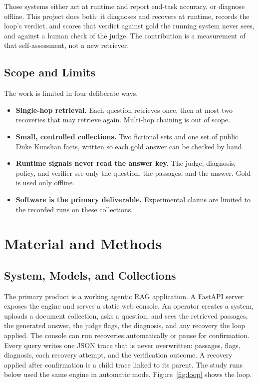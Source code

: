 \documentclass[12pt, a4paper, oneside]{report}
\begin{document}
Those systems either act at runtime and report end-task accuracy, or
diagnose offline. This project does both: it diagnoses and recovers at
runtime, records the loop's verdict, and scores that verdict against gold
the running system never sees, and against a human check of the judge.
The contribution is a measurement of that self-assessment, not a new
retriever.

\section{Scope and Limits}

The work is limited in four deliberate ways.

\begin{itemize}
\item \textbf{Single-hop retrieval.} Each question retrieves once, then
  at most two recoveries that may retrieve again. Multi-hop chaining is
  out of scope.
\item \textbf{Small, controlled collections.} Two fictional sets and one
  set of public Duke Kunshan facts, written so each gold answer can be
  checked by hand.
\item \textbf{Runtime signals never read the answer key.} The judge,
  diagnosis, policy, and verifier see only the question, the passages,
  and the answer. Gold is used only offline.
\item \textbf{Software is the primary deliverable.} Experimental claims
  are limited to the recorded runs on these collections.
\end{itemize}


\chapter{Material and Methods}
\label{material-and-methods}

\section{System, Models, and Collections}

The primary product is a working agentic RAG application. A FastAPI
server exposes the engine and serves a static web console. An operator
creates a system, uploads a document collection, asks a question, and
sees the retrieved passages, the generated answer, the judge flags, the
diagnosis, and any recovery the loop applied. The console can run
recoveries automatically or pause for confirmation. Every query writes
one JSON trace that is never overwritten: passages, flags, diagnosis,
each recovery attempt, and the verification outcome. A recovery applied
after confirmation is a child trace linked to its parent. The study
runs below used the same engine in automatic mode. Figure~\ref{fig:loop}
shows the loop.
\end{document}
